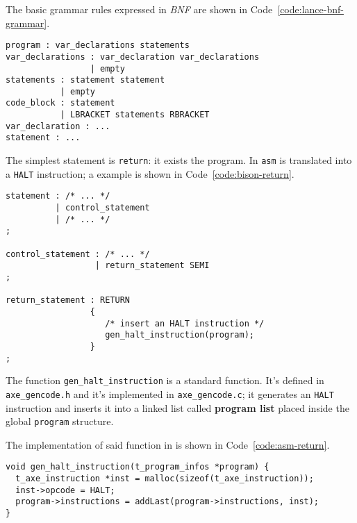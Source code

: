 \documentclass[english]{article}
\begin{document}
The basic grammar rules expressed in \textit{BNF} are shown in Code~\ref{code:lance-bnf-grammar}.

\begin{onepage}
  \begin{lstlisting}[language=LANCE, caption={\lance grammar in BNF}, label={code:lance-bnf-grammar}]
program : var_declarations statements
var_declarations : var_declaration var_declarations
                 | empty
statements : statement statement
           | empty
code_block : statement
           | LBRACKET statements RBRACKET
var_declaration : ...
statement : ...
\end{lstlisting}
\end{onepage}

The simplest statement is \texttt{return}: it exists the program.
In \texttt{asm} is translated into a \texttt{HALT} instruction;
a \bison example is shown in Code~\ref{code:bison-return}.

\begin{onepage}
  \begin{lstlisting}[language=LANCE, caption={\bison return}, label={code:bison-return}]
statement : /* ... */
          | control_statement
          | /* ... */
;

control_statement : /* ... */
                  | return_statement SEMI
;

return_statement : RETURN
                 {
                    /* insert an HALT instruction */
                    gen_halt_instruction(program);
                 }
;
\end{lstlisting}
\end{onepage}

The function \texttt{gen\_halt\_instruction} is a standard \clang function.
It's defined in \texttt{axe\_gencode.h} and it's implemented in \texttt{axe\_gencode.c};
it generates an \texttt{HALT} instruction and inserts it into a linked list called \textbf{program list} placed inside the global \texttt{program} structure.

The implementation of said function in \clang is shown in Code~\ref{code:asm-return}.

\begin{onepage}
  \begin{lstlisting}[language=LANCE, caption={\texttt{asm} return in \clang}, label={code:asm-return}]
void gen_halt_instruction(t_program_infos *program) {
  t_axe_instruction *inst = malloc(sizeof(t_axe_instruction));
  inst->opcode = HALT;
  program->instructions = addLast(program->instructions, inst);
}
\end{lstlisting}
\end{onepage}
\end{document}
